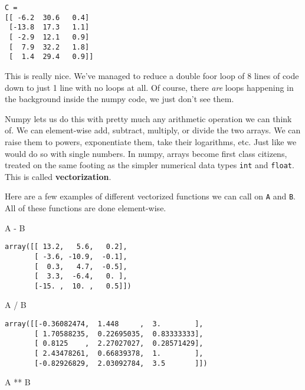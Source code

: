 \documentclass[
  letterpaper,
  DIV=11,
  numbers=noendperiod]{scrreprt}
\newenvironment{Shaded}{\begin{snugshade}}{\end{snugshade}}
\newcommand{\NormalTok}[1]{\textcolor[rgb]{0.00,0.23,0.31}{#1}}
\newcommand{\OperatorTok}[1]{\textcolor[rgb]{0.37,0.37,0.37}{#1}}
\begin{document}
\begin{verbatim}
C = 
[[ -6.2  30.6   0.4]
 [-13.8  17.3   1.1]
 [ -2.9  12.1   0.9]
 [  7.9  32.2   1.8]
 [  1.4  29.4   0.9]]
\end{verbatim}

This is really nice. We've managed to reduce a double foor loop of 8
lines of code down to just 1 line with no loops at all. Of course, there
\emph{are} loops happening in the background inside the numpy code, we
just don't see them.

Numpy lets us do this with pretty much any arithmetic operation we can
think of. We can element-wise add, subtract, multiply, or divide the two
arrays. We can raise them to powers, exponentiate them, take their
logarithms, etc. Just like we would do so with single numbers. In numpy,
arrays become first class citizens, treated on the same footing as the
simpler numerical data types \texttt{int} and \texttt{float}. This is
called \textbf{vectorization}.

Here are a few examples of different vectorized functions we can call on
\texttt{A} and \texttt{B}. All of these functions are done element-wise.

\begin{Shaded}
\begin{Highlighting}[]
\NormalTok{A }\OperatorTok{{-}}\NormalTok{ B}
\end{Highlighting}
\end{Shaded}

\begin{verbatim}
array([[ 13.2,   5.6,   0.2],
       [ -3.6, -10.9,  -0.1],
       [  0.3,   4.7,  -0.5],
       [  3.3,  -6.4,   0. ],
       [-15. ,  10. ,   0.5]])
\end{verbatim}

\begin{Shaded}
\begin{Highlighting}[]
\NormalTok{A }\OperatorTok{/}\NormalTok{ B}
\end{Highlighting}
\end{Shaded}

\begin{verbatim}
array([[-0.36082474,  1.448     ,  3.        ],
       [ 1.70588235,  0.22695035,  0.83333333],
       [ 0.8125    ,  2.27027027,  0.28571429],
       [ 2.43478261,  0.66839378,  1.        ],
       [-0.82926829,  2.03092784,  3.5       ]])
\end{verbatim}

\begin{Shaded}
\begin{Highlighting}[]
\NormalTok{A }\OperatorTok{**}\NormalTok{ B}
\end{Highlighting}
\end{Shaded}
\end{document}
